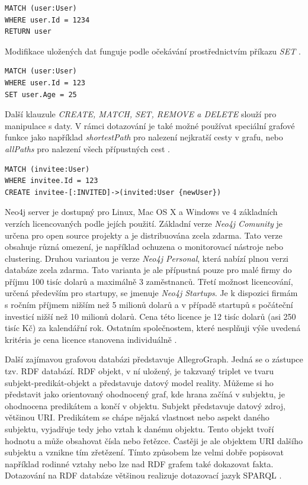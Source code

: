 \begin{lstlisting}[caption={Ukázka Neo4j dotazu, který získá uživatele s ID 123}]
MATCH (user:User)
WHERE user.Id = 1234
RETURN user
\end{lstlisting}

Modifikace uložených dat funguje podle očekávání prostřednictvím příkazu \emph{SET} \cite{cypher}.
\begin{lstlisting}[caption={Ukázka Neo4j dotazu který provede změnu věku uživatele 123}]
MATCH (user:User)
WHERE user.Id = 123
SET user.Age = 25
\end{lstlisting}

Další klauzule \emph{CREATE, MATCH, SET, REMOVE a DELETE} slouží pro manipulace s daty. V rámci dotazování je také možné používat speciální grafové funkce jako například \emph{shortestPath} pro nalezení nejkratší cesty v grafu, nebo \emph{allPaths} pro nalezení všech přípustných cest \cite{cypher}.
\begin{lstlisting}[caption={Ukázka Neo4j dotazu, který vytvoří nového uživatele,  poté ho spojí s uživatelem 123, který ho pozval (role invitee)}]
MATCH (invitee:User)
WHERE invitee.Id = 123
CREATE invitee-[:INVITED]->(invited:User {newUser})
\end{lstlisting}

Neo4j server je dostupný pro Linux, Mac OS X a Windows ve 4 základních verzích licencovaných podle jejích použití. Základní verze \emph{Neo4j Comunity} je určena pro open source projekty a je distribuována zcela zdarma. Tato verze obsahuje různá omezení, je například ochuzena o monitorovací nástroje nebo clustering. Druhou variantou je verze \emph{Neo4j Personal}, která nabízí plnou verzi databáze zcela zdarma. Tato varianta je ale přípustná pouze pro malé firmy do příjmu 100 tisíc dolarů a maximálně 3 zaměstnanců. Třetí možnost licencování, určená především pro startupy, se jmenuje \emph{Neo4j Startups}. Je k dispozici firmám s ročním příjmem nižším než 5 milionů dolarů a v případě startupů s počáteční investicí nižší než 10 milionů dolarů. Cena této licence je 12 tisíc dolarů (asi 250 tisíc Kč) za kalendářní rok. Ostatním společnostem, které nesplňuji výše uvedená kritéria je cena licence stanovena individuálně \cite{neo4jLicence}.

Další zajímavou grafovou databázi představuje AllegroGraph. Jedná se o zástupce tzv. RDF databází. RDF objekt, v ní uložený, je takzvaný triplet ve tvaru subjekt-predikát-objekt a představuje datový model reality. Můžeme si ho představit jako orientovaný ohodnocený graf, kde hrana začíná v subjektu, je ohodnocena predikátem a končí v objektu. Subjekt představuje datový zdroj, většinou URI. Predikátem se chápe nějaká vlastnost nebo aspekt daného subjektu, vyjadřuje tedy jeho vztah k danému objektu. Tento objekt tvoří hodnotu a může obsahovat čísla nebo řetězce. Častěji je ale objektem URI dalšího subjektu a vznikne tím zřetězení. Tímto způsobem lze velmi dobře popisovat například rodinné vztahy nebo lze nad RDF grafem také dokazovat fakta. Dotazování na RDF databáze většinou realizuje dotazovací jazyk SPARQL \cite{nosqlSlides}.

